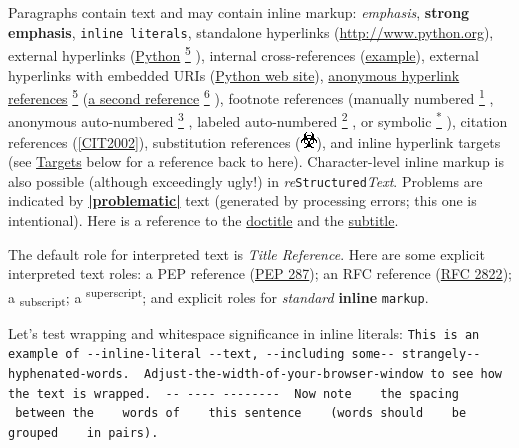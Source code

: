 \documentclass[a4paper]{article}
\providecommand*{\DUfootnotemark}[3]{%
  \raisebox{1em}{\hypertarget{#1}{}}%
  \hyperlink{#2}{\textsuperscript{#3}}%
}
\providecommand*{\DUroletitlereference}[1]{\textsl{#1}}
\begin{document}
Paragraphs contain text and may contain inline markup: \emph{emphasis},
\textbf{strong emphasis}, \texttt{inline literals}, standalone hyperlinks
(\url{http://www.python.org}), external hyperlinks (\href{http://www.python.org/}{Python}\DUfootnotemark{id30}{id29}{5}), internal
cross-references (\hyperref[example]{example}), external hyperlinks with embedded URIs
(\href{http://www.python.org}{Python web site}), \href{http://www.python.org/}{anonymous hyperlink
references}\DUfootnotemark{id33}{id29}{5} (\href{http://docutils.sourceforge.net/}{a second reference}\DUfootnotemark{id35}{id34}{6}), footnote references (manually
numbered\DUfootnotemark{id1}{id8}{1}, anonymous auto-numbered\DUfootnotemark{id2}{id12}{3}, labeled auto-numbered\DUfootnotemark{id3}{label}{2}, or symbolic\DUfootnotemark{id4}{id13}{*}), citation references (\hyperlink{cit2002}{[CIT2002]}),
substitution references (\includegraphics{../../../docs/user/rst/images/biohazard.png}), and %
\label{inline-hyperlink-targets}inline hyperlink targets
(see \hyperref[targets]{Targets} below for a reference back to here).  Character-level
inline markup is also possible (although exceedingly ugly!) in \emph{re}\texttt{Structured}\emph{Text}.  Problems are indicated by %
\hyperlink{id27}{\textbf{\color{red}|problematic|}} text
(generated by processing errors; this one is intentional).  Here is a
reference to the \hyperref[doctitle]{doctitle} and the \hyperref[subtitle]{subtitle}.

The default role for interpreted text is \DUroletitlereference{Title Reference}.  Here are
some explicit interpreted text roles: a PEP reference (\href{http://www.python.org/dev/peps/pep-0287}{PEP 287}); an
RFC reference (\href{http://www.faqs.org/rfcs/rfc2822.html}{RFC 2822}); a \textsubscript{subscript}; a \textsuperscript{superscript};
and explicit roles for \emph{standard} \textbf{inline}
\texttt{markup}.


Let's test wrapping and whitespace significance in inline literals:
\texttt{This is an example of -{}-inline-literal -{}-text, -{}-including some-{}-
strangely-{}-hyphenated-words. ~Adjust-the-width-of-your-browser-window
to see how the text is wrapped. ~-{}- -{}-{}-{}- -{}-{}-{}-{}-{}-{}-{}- ~Now note ~ ~the
spacing ~ ~between the ~ ~words of ~ ~this sentence ~ ~(words
should ~ ~be grouped ~ ~in pairs).}
\end{document}
